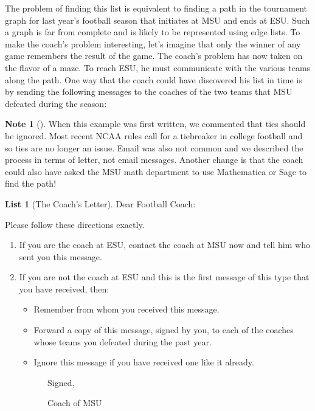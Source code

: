 \documentclass[10pt,]{book}
\theoremstyle{plain}
\theoremstyle{definition}
\theoremstyle{definition}
\newtheorem{note}[theorem]{Note}
\theoremstyle{definition}
\theoremstyle{definition}
\theoremstyle{definition}
\newtheorem{listwrapper}[theorem]{List}
\numberwithin{equation}{section}
\begin{document}
\par
The problem of finding this list is equivalent to finding a path in the tournament graph for last year's football season that initiates at MSU and ends at ESU. Such a graph is far from complete and is likely to be represented using edge lists. To make the coach's problem interesting,
let's imagine that only the winner of any game remembers the result of the game. The coach's problem has now taken on the flavor of a maze. To reach
ESU, he must communicate with the various teams along the path. One way that the coach could have discovered his list in time is by sending the following
messages to the coaches of the two teams that MSU defeated during the season:%
\begin{note}[]\label{note-4}
When this example was first written, we commented that ties should be ignored. Most recent NCAA rules call for a tiebreaker in college football and so ties are no longer an issue. Email was also not common and we described the process in terms of letter, not email messages. Another change is that the coach could also have asked the MSU math department to use Mathematica or Sage to find the path!%
\end{note}
\begin{listwrapper}[The Coach's Letter]\label{list-5}
\typeout{************************************************}
\typeout{************************************************}
Dear Football Coach:%
\par
Please follow these directions exactly.%
\leavevmode%
\begin{enumerate}
\item\hypertarget{li-39}{} If you are the coach at ESU, contact the coach at MSU now and tell him who sent you this message.%
\item\hypertarget{li-40}{} If you are not the coach at ESU and this is the first message of this type that you have received, then:%
\par
%
\begin{itemize}[label=\textbullet]
\item{}Remember from whom you received this message.%
\item{}Forward a copy of this message, signed by you, to each of the coaches whose teams you defeated during the past year. %
\item{}Ignore this message if you have received one like it already.%
\end{itemize}
%
\end{enumerate}
\typeout{************************************************}
\typeout{************************************************}
\bigbreak
\(\quad \quad \quad \quad \quad \)Signed,%
\par
\(\quad \quad \quad \quad \quad \)Coach of MSU%
\end{listwrapper}
\end{document}
